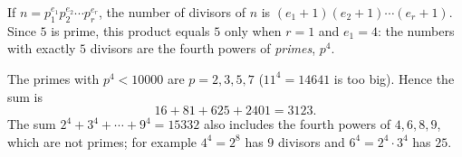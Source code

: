 If $n=p_1^{e_1}p_2^{e_2}\cdots p_r^{e_r}$, the number of divisors of $n$ is $(e_1+1)(e_2+1)\cdots(e_r+1)$. Since $5$ is prime, this product equals $5$ only when $r=1$ and $e_1=4$: the numbers with exactly $5$ divisors are the fourth powers of \emph{primes}, $p^4$.

The primes with $p^4<10000$ are $p=2,3,5,7$ ($11^4=14641$ is too big). Hence the sum is
\[
16+81+625+2401=\boxed{3123}.
\]
The sum $2^4+3^4+\cdots+9^4=15332$ also includes the fourth powers of $4,6,8,9$, which are not primes; for example $4^4=2^8$ has $9$ divisors and $6^4=2^4\cdot3^4$ has $25$.
